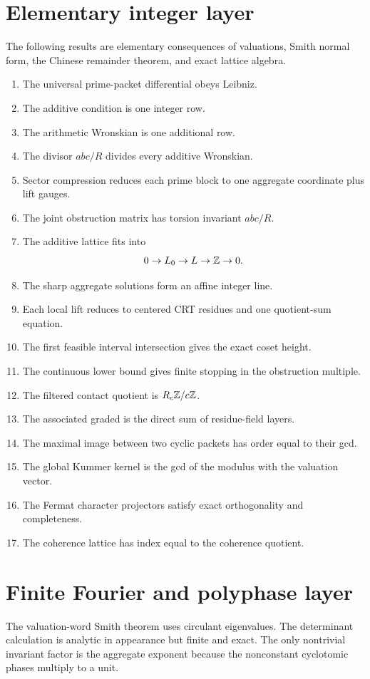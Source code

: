 \section{Elementary integer layer}
The following results are elementary consequences of valuations, Smith normal form, the Chinese remainder theorem, and exact lattice algebra.

\begin{enumerate}[leftmargin=1.5em]
\item The universal prime-packet differential obeys Leibniz.
\item The additive condition is one integer row.
\item The arithmetic Wronskian is one additional row.
\item The divisor $abc/R$ divides every additive Wronskian.
\item Sector compression reduces each prime block to one aggregate coordinate plus lift gauges.
\item The joint obstruction matrix has torsion invariant $abc/R$.
\item The additive lattice fits into
\[
 0\to L_0\to L\to\mathbb Z\to0.
\]
\item The sharp aggregate solutions form an affine integer line.
\item Each local lift reduces to centered CRT residues and one quotient-sum equation.
\item The first feasible interval intersection gives the exact coset height.
\item The continuous lower bound gives finite stopping in the obstruction multiple.
\item The filtered contact quotient is $R_c\mathbb Z/c\mathbb Z$.
\item The associated graded is the direct sum of residue-field layers.
\item The maximal image between two cyclic packets has order equal to their gcd.
\item The global Kummer kernel is the gcd of the modulus with the valuation vector.
\item The Fermat character projectors satisfy exact orthogonality and completeness.
\item The coherence lattice has index equal to the coherence quotient.
\end{enumerate}

\section{Finite Fourier and polyphase layer}
The valuation-word Smith theorem uses circulant eigenvalues. The determinant calculation is analytic in appearance but finite and exact. The only nontrivial invariant factor is the aggregate exponent because the nonconstant cyclotomic phases multiply to a unit.

